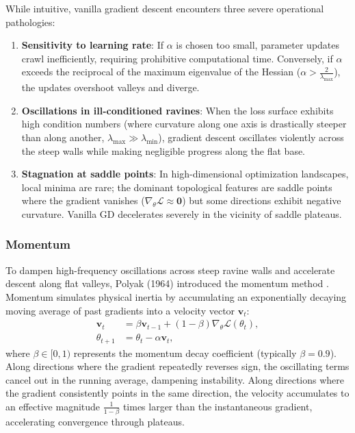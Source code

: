 \documentclass[../../../main.tex]{subfiles}
\begin{document}
While intuitive, vanilla gradient descent encounters three severe operational pathologies:
\begin{enumerate}[label=(\roman*)]
    \item \textbf{Sensitivity to learning rate}: If $\alpha$ is chosen too small, parameter updates crawl inefficiently, requiring prohibitive computational time. Conversely, if $\alpha$ exceeds the reciprocal of the maximum eigenvalue of the Hessian ($\alpha > \frac{2}{\lambda_{\max}}$), the updates overshoot valleys and diverge.
    \item \textbf{Oscillations in ill-conditioned ravines}: When the loss surface exhibits high condition numbers (where curvature along one axis is drastically steeper than along another, $\lambda_{\max} \gg \lambda_{\min}$), gradient descent oscillates violently across the steep walls while making negligible progress along the flat base.
    \item \textbf{Stagnation at saddle points}: In high-dimensional optimization landscapes, local minima are rare; the dominant topological features are saddle points where the gradient vanishes ($\nabla_\theta \mathcal{L} \approx \mathbf{0}$) but some directions exhibit negative curvature. Vanilla GD decelerates severely in the vicinity of saddle plateaus.
\end{enumerate}

\subsubsection{Momentum}

To dampen high-frequency oscillations across steep ravine walls and accelerate descent along flat valleys, Polyak (1964) introduced the momentum method \citep{goodfellow2016}. Momentum simulates physical inertia by accumulating an exponentially decaying moving average of past gradients into a velocity vector $\mathbf{v}_t$:
\begin{align}
\mathbf{v}_t &= \beta \mathbf{v}_{t-1} + (1 - \beta) \nabla_\theta \mathcal{L}(\theta_t), \label{eq:momentum_velocity} \\
\theta_{t+1} &= \theta_t - \alpha \mathbf{v}_t, \label{eq:momentum_update}
\end{align}
where $\beta \in [0, 1)$ represents the momentum decay coefficient (typically $\beta = 0.9$). Along directions where the gradient repeatedly reverses sign, the oscillating terms cancel out in the running average, dampening instability. Along directions where the gradient consistently points in the same direction, the velocity accumulates to an effective magnitude $\frac{1}{1 - \beta}$ times larger than the instantaneous gradient, accelerating convergence through plateaus.
\end{document}

